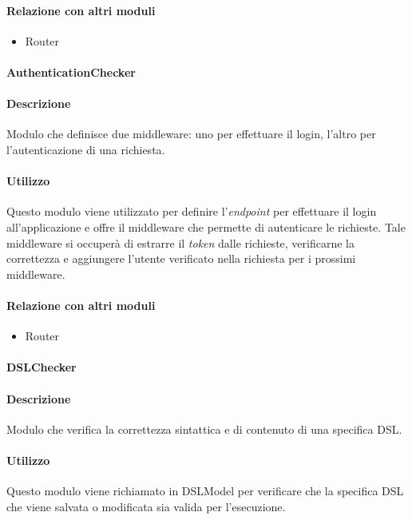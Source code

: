 \paragraph*{Relazione con altri moduli}
\begin{itemize}
\item Router
\end{itemize}

\paragraph{AuthenticationChecker}
\paragraph*{Descrizione}
Modulo che definisce due middleware: uno per effettuare il login, l'altro per l'autenticazione di una richiesta.

\paragraph*{Utilizzo}
Questo modulo viene utilizzato per definire l'\textit{endpoint} per effettuare il login all'applicazione e offre il middleware che permette di autenticare le richieste. Tale middleware si occuperà di estrarre il \textit{token} dalle richieste, verificarne la correttezza e aggiungere l'utente verificato nella richiesta per i prossimi middleware.

\paragraph*{Relazione con altri moduli}
\begin{itemize}
\item Router
\end{itemize}

\paragraph{DSLChecker}
\paragraph*{Descrizione}
Modulo che verifica la correttezza sintattica e di contenuto di una specifica DSL.

\paragraph*{Utilizzo}
Questo modulo viene richiamato in DSLModel per verificare che la specifica DSL che viene salvata o modificata sia valida per l'esecuzione.

